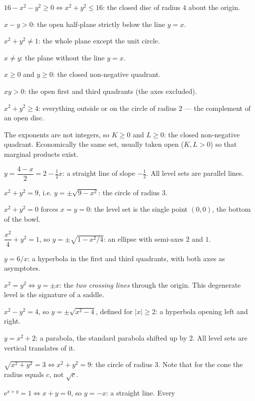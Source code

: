 \begin{solutions}
  \item $16-x^{2}-y^{2}\ge0\iff x^{2}+y^{2}\le16$: the closed disc of
        radius $4$ about the origin.
  \item $x-y>0$: the open half-plane strictly below the line $y=x$.
  \item $x^{2}+y^{2}\neq1$: the whole plane except the unit circle.
  \item $x\neq y$: the plane without the line $y=x$.
  \item $x\ge0$ and $y\ge0$: the closed non-negative quadrant.
  \item $xy>0$: the open first and third quadrants (the axes excluded).
  \item $x^{2}+y^{2}\ge4$: everything outside or on the circle of radius
        $2$ --- the complement of an open disc.
  \item The exponents are not integers, so $K\ge0$ and $L\ge0$: the closed
        non-negative quadrant. Economically the same set, usually taken
        open ($K,L>0$) so that marginal products exist.
  \item $y=\dfrac{4-x}{2}=2-\tfrac12x$: a straight line of slope
        $-\tfrac12$. All level sets are parallel lines.
  \item $x^{2}+y^{2}=9$, i.e. $y=\pm\sqrt{9-x^{2}}$: the circle of radius
        $3$.
  \item $x^{2}+y^{2}=0$ forces $x=y=0$: the level set is the single point
        $(0,0)$, the bottom of the bowl.
  \item $\dfrac{x^{2}}{4}+y^{2}=1$, so $y=\pm\sqrt{1-x^{2}/4}$: an ellipse
        with semi-axes $2$ and $1$.
  \item $y=6/x$: a hyperbola in the first and third quadrants, with both
        axes as asymptotes.
  \item $x^{2}=y^{2}\iff y=\pm x$: the \emph{two crossing lines} through
        the origin. This degenerate level is the signature of a saddle.
  \item $x^{2}-y^{2}=4$, so $y=\pm\sqrt{x^{2}-4}$, defined for
        $|x|\ge2$: a hyperbola opening left and right.
  \item $y=x^{2}+2$: a parabola, the standard parabola shifted up by $2$.
        All level sets are vertical translates of it.
  \item $\sqrt{x^{2}+y^{2}}=3\iff x^{2}+y^{2}=9$: the circle of radius
        $3$. Note that for the cone the radius equals $c$, not
        $\sqrt{c}$.
  \item $\mathrm{e}^{x+y}=1\iff x+y=0$, so $y=-x$: a straight line. Every

\end{solutions}
